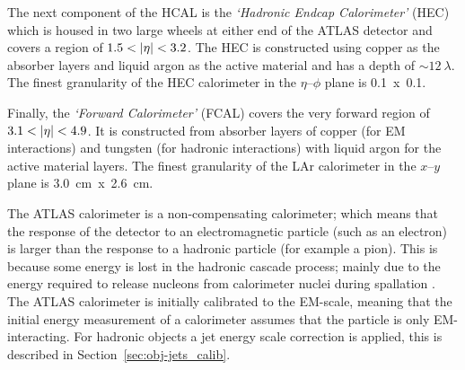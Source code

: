 The next component of the HCAL is the \textit{`Hadronic Endcap Calorimeter'} (HEC)
which is housed in two large wheels at either end of the ATLAS detector
and covers a region of $1.5\nobreak<\nobreak|\eta|\nobreak<\nobreak3.2$.
The HEC is constructed using copper as the absorber layers and liquid argon as the active material
and has a depth of $\sim 12~\lambda$.
The finest granularity of the HEC calorimeter in the $\eta$--$\phi$ plane is \mbox{0.1~x~0.1.}

Finally, the \textit{`Forward Calorimeter'} (FCAL) covers the very forward region of $3.1\nobreak<\nobreak|\eta|\nobreak<\nobreak4.9$.
It is constructed from absorber layers of
copper (for EM interactions) and tungsten (for hadronic interactions)
with liquid argon for the active material layers.
The finest granularity of the LAr calorimeter in the $x$--$y$ plane is 3.0~cm~x~2.6~cm.


The ATLAS calorimeter is a non-compensating calorimeter;
which means that the response of the detector to an electromagnetic particle (such as an electron)
is larger than the response to a hadronic particle (for example a pion).
This is because some energy is lost in the hadronic cascade process;
mainly due to the energy required to release nucleons from calorimeter nuclei during spallation \cite{det-comp_calo, det-thesis_lene}.
The ATLAS calorimeter is initially calibrated to the EM-scale,
meaning that the initial energy measurement of a calorimeter assumes that the particle is only EM-interacting.
For hadronic objects a jet energy scale correction is applied,
this is described in Section~\ref{sec:obj-jets_calib}.

